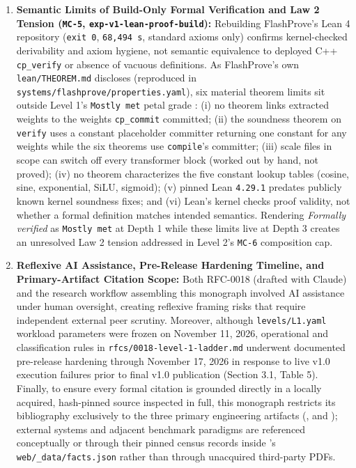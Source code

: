 \documentclass[11pt,letterpaper]{article}
\begin{document}
\begin{enumerate}
\item \textbf{Semantic Limits of Build-Only Formal Verification and Law 2 Tension (\texttt{MC-5}, \texttt{exp-\allowbreak{}v1-\allowbreak{}lean-\allowbreak{}proof-\allowbreak{}build}):} Rebuilding FlashProve's Lean 4 repository (\texttt{exit 0}, \texttt{68,494 s}, standard axioms only) confirms kernel-checked derivability and axiom hygiene, not semantic equivalence to deployed C++ \texttt{cp\_\allowbreak{}verify} or absence of vacuous definitions. As FlashProve's own \texttt{lean/\allowbreak{}THEOREM.\allowbreak{}md} discloses (reproduced in \texttt{systems/\allowbreak{}flashprove/\allowbreak{}properties.\allowbreak{}yaml}), six material theorem limits sit outside Level 1's \texttt{Mostly met} petal grade \cite{iproofs2026,rinberg2026flashprove}: (i) no theorem links extracted weights to the weights \texttt{cp\_\allowbreak{}commit} committed; (ii) the soundness theorem on \texttt{verify} uses a constant placeholder committer returning one constant for any weights while the six theorems use \texttt{compile}'s committer; (iii) scale files in scope can switch off every transformer block (worked out by hand, not proved); (iv) no theorem characterizes the five constant lookup tables (cosine, sine, exponential, SiLU, sigmoid); (v) pinned Lean \texttt{4.29.1} predates publicly known kernel soundness fixes; and (vi) Lean's kernel checks proof validity, not whether a formal definition matches intended semantics. Rendering \textit{Formally verified} as \texttt{Mostly met} at Depth 1 while these limits live at Depth 3 creates an unresolved Law 2 tension addressed in Level 2's \texttt{MC-6} composition cap.
\item \textbf{Reflexive AI Assistance, Pre-Release Hardening Timeline, and Primary-Artifact Citation Scope:} Both RFC-0018 (drafted with Claude) and the research workflow assembling this monograph involved AI assistance under human oversight, creating reflexive framing risks that require independent external peer scrutiny. Moreover, although \texttt{levels/\allowbreak{}L1.\allowbreak{}yaml} workload parameters were frozen on November 11, 2026, operational and classification rules in \texttt{rfcs/\allowbreak{}0018-\allowbreak{}level-1-\allowbreak{}ladder.\allowbreak{}md} underwent documented pre-release hardening through November 17, 2026 in response to live v1.0 execution failures prior to final v1.0 publication (Section 3.1, Table 5). Finally, to ensure every formal citation is grounded directly in a locally acquired, hash-pinned source inspected in full, this monograph restricts its bibliography exclusively to the three primary engineering artifacts (\cite{iproofs2026,rinberg2026flashprove}, and \cite{sash2026}); external systems and adjacent benchmark paradigms are referenced conceptually or through their pinned census records inside \cite{iproofs2026}'s \texttt{web/\allowbreak{}\_\allowbreak{}data/\allowbreak{}facts.\allowbreak{}json} rather than through unacquired third-party PDFs.

\end{enumerate}
\end{document}
